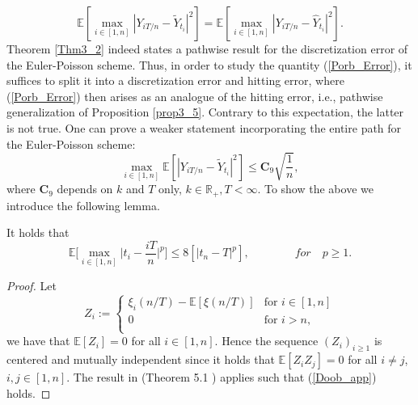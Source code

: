\begin{equation}\label{Porb_Error}
    \mathbb{E}[\max_{i \in [1, n]} |Y_{iT/n} - \tilde{Y}_{t_i}|^2] = \mathbb{E}[\max_{i \in [1, n]} |Y_{iT/n} - \hat{Y}_{t_i}|^2].
\end{equation}
Theorem \ref{Thm3_2} indeed states a pathwise result for the discretization error of the Euler-Poisson scheme. Thus, in order to study the quantity (\ref{Porb_Error}), it suffices to split it into a discretization error and hitting error, where (\ref{Porb_Error}) then arises as an analogue of the hitting error, i.e., pathwise generalization of Proposition \ref{prop3_5}. Contrary to this expectation, the latter is not true. One can prove a weaker statement incorporating the entire path for the Euler-Poisson scheme:
\begin{equation}\label{eqFinal}
    \max_{i \in [1, n]}\mathbb{E}[|Y_{iT/n} - \tilde{Y}_{t_i}|^2] \leq \mathbf{C}_9\sqrt{\dfrac{1}{n}},
\end{equation}
where $\mathbf{C}_9 $ depends on $k$ and $T$ only, $k \in \mathbb{R}_+, T < \infty$. To show the above we introduce the following lemma.
\begin{lemma}\label{eq3_4}
It holds that
\begin{equation}\label{Doob_app}
    \mathbb{E}\Bigg[ \max_{i \in [1, n]}\bigg| t_i - \dfrac{iT}{n}\bigg|^p\Bigg] \leq 8[|t_n - T|^p], \qquad \qquad for \quad p \geq 1.
\end{equation}
\end{lemma}
\begin{proof}
Let 
\[
 Z_i :=
  \begin{cases} 
   \xi_i(n/T) - \mathbb{E}[\xi(n/T)] & \text{for } i \in [1, n] \\
   0  & \text{for } i > n, \\
  \end{cases}
\]
we have that $\mathbb{E}[Z_i] =0$ for all $i \in [1, n]$. Hence the sequence $(Z_i)_{i \geq 1}$ is centered and mutually independent since it holds that  $\mathbb{E}[Z_i Z_j] = 0$ for all $i\neq j$, $i, j \in [1, n]$. The result in (Theorem 5.1 ) applies such that (\ref{Doob_app}) holds.
\end{proof}
